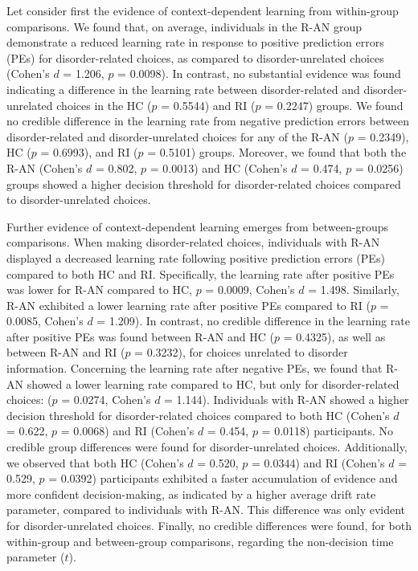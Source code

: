 \documentclass[
  man,floatsintext]{apa6}
\begin{document}
Let consider first the evidence of context-dependent learning from within-group comparisons. We found that, on average, individuals in the R-AN group demonstrate a reduced learning rate in response to positive prediction errors (PEs) for disorder-related choices, as compared to disorder-unrelated choices (Cohen's \(d\) = 1.206, \(p\) = 0.0098). In contrast, no substantial evidence was found indicating a difference in the learning rate between disorder-related and disorder-unrelated choices in the HC (\(p\) = 0.5544) and RI (\(p\) = 0.2247) groups. We found no credible difference in the learning rate from negative prediction errors between disorder-related and disorder-unrelated choices for any of the R-AN (\(p\) = 0.2349), HC (\(p\) = 0.6993), and RI (\(p\) = 0.5101) groups. Moreover, we found that both the R-AN (Cohen's \(d\) = 0.802, \(p\) = 0.0013) and HC (Cohen's \(d\) = 0.474, \(p\) = 0.0256) groups showed a higher decision threshold for disorder-related choices compared to disorder-unrelated choices.

Further evidence of context-dependent learning emerges from between-groups comparisons. When making disorder-related choices, individuals with R-AN displayed a decreased learning rate following positive prediction errors (PEs) compared to both HC and RI. Specifically, the learning rate after positive PEs was lower for R-AN compared to HC, \(p\) = 0.0009, Cohen's \(d\) = 1.498. Similarly, R-AN exhibited a lower learning rate after positive PEs compared to RI (\(p\) = 0.0085, Cohen's \(d\) = 1.209). In contrast, no credible difference in the learning rate after positive PEs was found between R-AN and HC (\(p\) = 0.4325), as well as between R-AN and RI (\(p\) = 0.3232), for choices unrelated to disorder information. Concerning the learning rate after negative PEs, we found that R-AN showed a lower learning rate compared to HC, but only for disorder-related choices: (\(p\) = 0.0274, Cohen's \(d\) = 1.144). Individuals with R-AN showed a higher decision threshold for disorder-related choices compared to both HC (Cohen's \(d\) = 0.622, \(p\) = 0.0068) and RI (Cohen's \(d\) = 0.454, \(p\) = 0.0118) participants. No credible group differences were found for disorder-unrelated choices. Additionally, we observed that both HC (Cohen's \(d\) = 0.520, \(p\) = 0.0344) and RI (Cohen's \(d\) = 0.529, \(p\) = 0.0392) participants exhibited a faster accumulation of evidence and more confident decision-making, as indicated by a higher average drift rate parameter, compared to individuals with R-AN. This difference was only evident for disorder-unrelated choices. Finally, no credible differences were found, for both within-group and between-group comparisons, regarding the non-decision time parameter (\(t\)).
\end{document}
